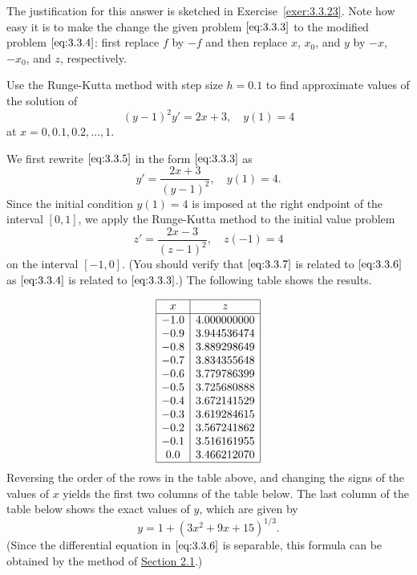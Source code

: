 \documentclass{ximera}
\begin{document}
The justification for this answer is sketched in
Exercise~\ref{exer:3.3.23}. Note how easy it is to make the change
the given problem $\eqref{eq:3.3.3}$ to the modified problem
$\eqref{eq:3.3.4}$: first replace $f$ by $-f$ and then replace $x$,
$x_0$, and $y$ by $-x$, $-x_0$, and $z$, respectively.


\begin{example}\label{example:3.3.5}
Use the Runge-Kutta  method with step size $h=0.1$
 to find approximate values of the solution of
\begin{equation} \label{eq:3.3.5}
(y-1)^2y'=2x+3,\quad y(1)=4
\end{equation}
at $x=0, 0.1, 0.2, \dots, 1$.


\begin{explanation} 
We first rewrite $\eqref{eq:3.3.5}$ in the form $\eqref{eq:3.3.3}$
as
\begin{equation} \label{eq:3.3.6}
y'=\frac{2x+3}{(y-1)^2},\quad y(1)=4.
\end{equation}
Since the initial condition $y(1)=4$  is imposed at the right endpoint
of the interval $[0,1]$, we apply the Runge-Kutta method to the
initial value problem
\begin{equation} \label{eq:3.3.7}
z'=\frac{2x-3}{(z-1)^2},\quad z(-1)=4
\end{equation}
on the interval $[-1,0]$.
(You should verify that $\eqref{eq:3.3.7}$ is related to $\eqref{eq:3.3.6}$ as
$\eqref{eq:3.3.4}$ is related to $\eqref{eq:3.3.3}$.)
 The following table shows the results.  
 
$$
\begin{array}{|c|c|}
\hline
x&
z\\ \hline
-1.0 & 4.000000000  \\
-0.9 & 3.944536474  \\
-0.8 & 3.889298649  \\
-0.7 & 3.834355648  \\
-0.6 & 3.779786399  \\
-0.5 & 3.725680888  \\
-0.4 & 3.672141529  \\
-0.3 & 3.619284615  \\
-0.2 & 3.567241862  \\
-0.1 & 3.516161955  \\
 0.0 & 3.466212070 \\
\hline
\end{array}
$$
 Reversing the
order of the
rows in the table above, and changing the signs of the values of $x$
yields the first two columns of the table below.   The last
column of the table below shows the exact values of $y$, which
are given by
$$
y=1+(3x^2+9x+15)^{1/3}.
$$
(Since the differential equation in $\eqref{eq:3.3.6}$ is separable,
this formula can be obtained by the method of \href{https://xerxes.ximera.org/differentialequations/main/separableEquations/separableEquations}{Section 2.1}.)



\end{explanation}
\end{example}
\end{document}
